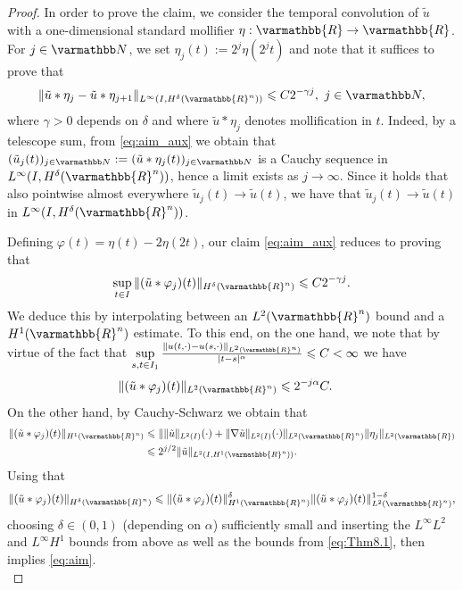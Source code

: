 \documentclass[12pt,twoside]{amsart}
\numberwithin{equation}{section}
\renewcommand{\leq}{\leqslant}
\renewcommand{\mathbb}{\varmathbb}
\newcommand {\R} {\mathbb{R}} \newcommand {\Z} {\mathbb{Z}}
\begin{document}
\begin{proof}
In order to prove the claim, we consider the temporal convolution of $\tilde{u}$ with a one-dimensional standard mollifier $\eta: \R \rightarrow \R$. For $j\in \N$, we set $\eta_{j}(t):= 2^{j}\eta(2^{j}t)$ and note that it suffices to prove that
\begin{align}
\label{eq:aim_aux}
\| \tilde{u} \ast \eta_{ j} - \tilde{u} \ast \eta_{j+1}\|_{L^{\infty}(I, H^{\delta}(\R^n))} \leq C 2^{- \gamma j}, \ j\in \N,
\end{align}
where $\gamma>0$ depends on $\delta$ and where $\tilde{u} \ast \eta_{ j}$ denotes mollification in $t$. Indeed, by a telescope sum, from \eqref{eq:aim_aux} we obtain that $(\tilde{u}_j(t))_{j\in \N}:= (\tilde{u}\ast \eta_j(t))_{j\in \N}$ is a Cauchy sequence in $L^{\infty}(I, H^{\delta}(\R^n))$, hence a limit exists as $j \rightarrow \infty$. Since it holds that also pointwise almost everywhere $\tilde{u}_j(t) \rightarrow \tilde{u}(t)$, we have that $\tilde{u}_j(t) \rightarrow \tilde{u}(t)$ in $L^{\infty}(I, H^{\delta}(\R^n))$. 

Defining $\varphi(t)= \eta(t)-2 \eta(2 t)$, our claim \eqref{eq:aim_aux} reduces to proving that 
\begin{align}
\label{eq:aim}
\sup\limits_{t\in I}\|(\tilde{u} \ast \varphi_j)(t)\|_{H^{\delta}(\R^n)} \leq C 2^{-\gamma j}.
\end{align}
We deduce this by interpolating between an $L^2(\R^n)$ bound and a $H^1(\R^n)$ estimate.
To this end, on the one hand, we note that by virtue of the fact that $\sup\limits_{s,t\in I_1}\frac{\|u(t,\cdot)-u(s,\cdot)\|_{L^2(\R^n)}}{|t-s|^{\alpha}}\leq C <\infty$  we have
\begin{align*}
\|(\tilde{u}\ast \varphi_j)(t)\|_{L^2(\R^n)} &\leq 2^{-j \alpha}C .
\end{align*}
On the other hand, by Cauchy-Schwarz we obtain that 
\begin{align*}
\|(\tilde{u}\ast \varphi_j)(t)\|_{H^1(\R^n)} &\leq \|\|\tilde{u}\|_{L^2(I)}(\cdot)+ \|\nabla \tilde{u}\|_{L^2(I)}(\cdot)\|_{L^2(\R^n)} \|\eta_j\|_{L^2(\R)}\\
& \leq  2^{j /2}\|\tilde{u}\|_{L^2(I,H^1(\R^n))}.
\end{align*}
Using that 
\begin{align*}
\|(\tilde{u} \ast \varphi_j)(t)\|_{H^{\delta}(\R^n)} \leq \|(\tilde{u} \ast \varphi_j)(t)\|_{H^1(\R^n)}^{\delta} \|(\tilde{u} \ast \varphi_j)(t)\|_{L^2(\R^n)}^{1-\delta},
\end{align*}
choosing $\delta \in (0,1)$ (depending on $\alpha$) sufficiently small and inserting the $L^{\infty}L^2$ and $L^{\infty}H^1$ bounds from above as well as the bounds from \eqref{eq:Thm8.1}, then implies \eqref{eq:aim}. \\


\end{proof}
\end{document}
